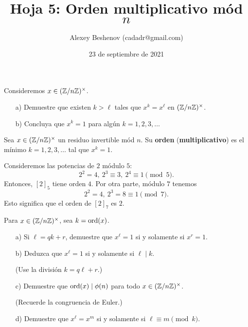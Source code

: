 \documentclass{article}
\title{Hoja 5: Orden multiplicativo mód $n$}
\author{Alexey Beshenov (cadadr@gmail.com)}
\date{23 de septiembre de 2021}
\begin{document}
\maketitle

\thispagestyle{empty}

\setcounter{section}{5}

\begin{problema}
  Consideremos $x \in (\mathbb{Z}/n\mathbb{Z})^\times$.

  \begin{enumerate}
  \item[a)] Demuestre que existen $k > \ell$ tales que $x^k = x^\ell$ en
    $(\mathbb{Z}/n\mathbb{Z})^\times$.

  \item[b)] Concluya que $x^k = 1$ para algún $k = 1,2,3,\ldots$
  \end{enumerate}
\end{problema}

\begin{definicion}
  Sea $x \in (\mathbb{Z}/n\mathbb{Z})^\times$ un residuo invertible mód $n$. Su \textbf{orden}
  (\textbf{multiplicativo}) es el mínimo $k = 1,2,3,\ldots$ tal que $x^k = 1$.
\end{definicion}

\begin{ejemplo}
  Consideremos las potencias de $2$ módulo $5$:
  \[
    2^2 = 4, ~
    2^3 \equiv 3, ~
    2^4 \equiv 1 \pmod{5}.
  \]
  Entonces, $[2]_5$ tiene orden $4$. Por otra parte, módulo $7$ tenemos
  \[
    2^2 = 4, ~
    2^3 = 8 \equiv 1 \pmod{7}.
  \]
  Esto significa que el orden de $[2]_7$ es $2$.
\end{ejemplo}

\begin{problema}
  Para $x \in (\mathbb{Z}/n\mathbb{Z})^\times$, sea $k = \operatorname{ord} (x)$.

  \begin{enumerate}
  \item[a)] Si $\ell = qk + r$, demuestre que $x^\ell = 1$ si y solamente si
    $x^r = 1$.

  \item[b)] Deduzca que $x^\ell = 1$ si y solamente si $\ell \mid k$.

    (Use la división $k = q\ell + r$.)

  \item[c)] Demuestre que $\operatorname{ord} (x) \mid \phi(n)$ para todo
    $x \in (\mathbb{Z}/n\mathbb{Z})^\times$.

    (Recuerde la congruencia de Euler.)

  \item[d)] Demuestre que $x^\ell = x^m$ si y solamente si
    $\ell \equiv m \pmod{k}$.
  \end{enumerate}
\end{problema}
\end{document}
